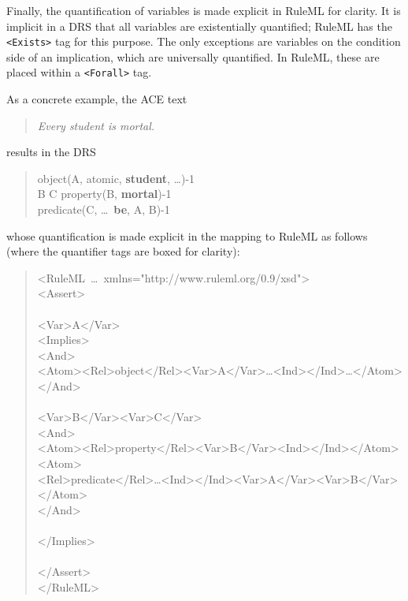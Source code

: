 \documentclass[12pt]{article}
\begin{document}
Finally, the quantification of variables is made explicit in RuleML for clarity. It is implicit in a DRS that all variables are existentially quantified; RuleML has the \verb|<Exists>| tag for this purpose. The only exceptions are variables on the condition side of an implication, which are universally quantified. In RuleML, these are placed within a \verb|<Forall>| tag.

As a concrete example, the ACE text
\begin{quote}
\textit{Every student is mortal.}
\end{quote}
results in the DRS
\begin{quote}
\drs{~}
{
	{
	object(A, atomic, \textbf{student}, \ldots)-1\\
	}
	{B C}
	{
	property(B, \textbf{mortal})-1\\
	predicate(C, \ldots~\textbf{be}, A, B)-1
	}
}
\end{quote}
whose quantification is made explicit in the mapping to RuleML as follows (where the quantifier tags are boxed for clarity):

\begin{quote}
\small
\ttfamily
\setlength{\parindent}{0.1in}
<RuleML~\ldots~xmlns="http://www.ruleml.org/0.9/xsd">\\
\indent <Assert>\\
\indent \indent {}\\
\indent \indent \indent <Var>A</Var>\\
\indent \indent \indent <Implies>\\
\indent \indent \indent \indent <And>\\
\indent \indent \indent \indent \indent <Atom><Rel>object</Rel><Var>A</Var>\ldots<Ind></Ind>\ldots</Atom>\\
\indent \indent \indent \indent </And>\\
\indent \indent \indent \indent {}\\
\indent \indent \indent \indent \indent <Var>B</Var><Var>C</Var>\\
\indent \indent \indent \indent \indent <And>\\
\indent \indent \indent \indent \indent \indent <Atom><Rel>property</Rel><Var>B</Var><Ind></Ind></Atom>\\
\indent \indent \indent \indent \indent \indent <Atom>\\
\indent \indent \indent \indent \indent  \indent \indent <Rel>predicate</Rel>\ldots<Ind></Ind><Var>A</Var><Var>B</Var>\\
\indent \indent \indent \indent \indent  \indent </Atom>\\
\indent \indent \indent \indent \indent </And>\\
\indent \indent \indent \indent {}\\
\indent \indent \indent </Implies>\\
\indent \indent {}\\
\indent </Assert>\\
</RuleML>
\setlength{\parindent}{0.0in}
\normalfont
\end{quote}
\end{document}
